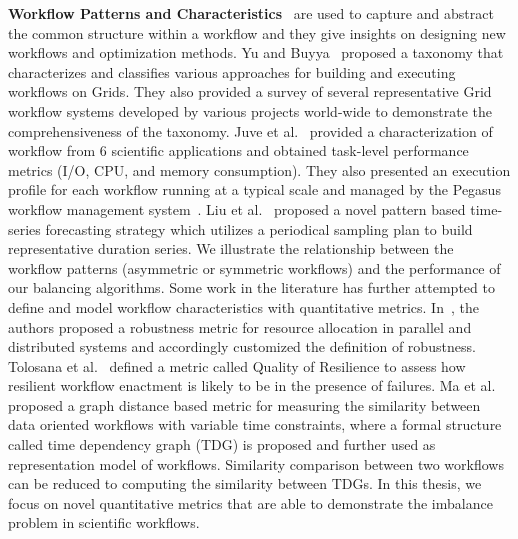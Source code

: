\textbf{Workflow Patterns and Characteristics}~\cite{Yu2005a, Juve2013, Liu2008} are used to capture and abstract the common structure within a workflow and they give insights on designing new workflows and optimization methods. Yu and Buyya~\cite{Yu2005a} proposed a taxonomy that characterizes and classifies various approaches for building and executing workflows on Grids. They also provided a survey of several representative Grid workflow systems developed by various projects world-wide to demonstrate the comprehensiveness of the taxonomy. Juve et al.~\cite{Juve2013} provided a characterization of workflow from 6 scientific applications and obtained task-level performance metrics (I/O, CPU, and memory consumption). They also presented an execution profile for each workflow running at a typical scale and managed by the Pegasus workflow management system~\cite{Deelman2005}. Liu et al.~\cite{Liu2008} proposed a novel pattern based time-series forecasting strategy which utilizes a periodical sampling plan to build representative duration series. We illustrate the relationship between the workflow patterns (asymmetric or symmetric workflows) and the performance of our balancing algorithms. 
Some work in the literature has further attempted to define and model workflow characteristics with quantitative metrics. In~\cite{Ali2004}, the authors proposed a robustness metric for resource allocation in parallel and distributed systems and accordingly customized the definition of robustness. Tolosana et al.~\cite{Tolosana2011} defined a metric called Quality of Resilience to assess how resilient workflow enactment is likely to be in the presence of failures. Ma et al. ~\cite{Ma:2014:GDB:2560969.2561388} proposed a graph distance based metric for measuring the similarity between data oriented workflows with variable time constraints, where a formal structure called time dependency graph (TDG) is proposed and further used as representation model of workflows. Similarity comparison between two workflows can be reduced to computing the similarity between TDGs. In this thesis, we focus on novel quantitative metrics that are able to demonstrate the imbalance problem in scientific workflows. 

